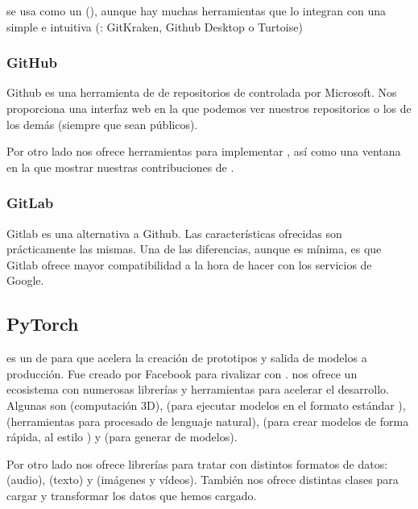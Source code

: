  se usa como un  (), aunque hay muchas herramientas que lo integran con una  simple e intuitiva (\pe: GitKraken, Github Desktop o Turtoise)

\subsubsection{GitHub}

Github es una herramienta de  de repositorios de  controlada por Microsoft. Nos proporciona una interfaz web en la que podemos ver nuestros repositorios o los de los demás (siempre que sean públicos).

Por otro lado nos ofrece herramientas para implementar , así como una ventana en la que mostrar nuestras contribuciones de .


\subsubsection{GitLab}

Gitlab es una alternativa a Github. Las características ofrecidas son prácticamente las mismas. Una de las diferencias, aunque es mínima, es que Gitlab ofrece mayor compatibilidad a la hora de hacer  con los servicios de Google.


\subsection{PyTorch}

 es un  de  para  que acelera la creación de prototipos y salida de modelos a producción. Fue creado por Facebook para rivalizar con .  nos ofrece un ecosistema con numerosas librerías y herramientas para acelerar el desarrollo. Algunas son  (computación 3D),  (para ejecutar modelos en el formato estándar ),  (herramientas para procesado de lenguaje natural),  (para crear modelos de forma rápida, al estilo ) y  (para generar  de modelos).

Por otro lado nos ofrece librerías para tratar con distintos formatos de datos:  (audio),  (texto) y  (imágenes y vídeos). También nos ofrece distintas clases para cargar   y transformar los datos que hemos cargado.

